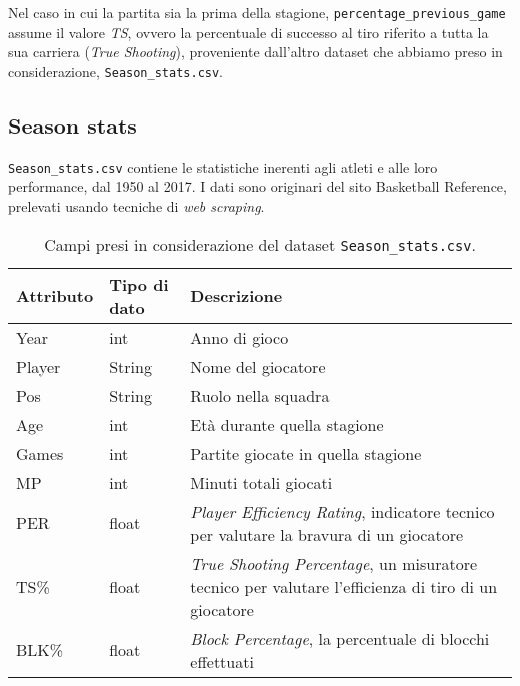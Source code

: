 \begin{code}
\inputminted[breaklines]{python}{../datasets/shot_logs_nv.py}
\end{code}

Nel caso in cui la partita sia la prima della stagione, \texttt{percentage\_previous\_game} assume il valore \textit{TS}, ovvero la percentuale di successo al tiro riferito a tutta la sua carriera (\textit{True Shooting}), proveniente dall’altro dataset che abbiamo preso in considerazione, \texttt{Season\_stats.csv}.

\subsection{Season stats}

\texttt{Season\_stats.csv} contiene le statistiche inerenti agli atleti e alle loro performance, dal 1950 al 2017. I dati sono originari del sito Basketball Reference, prelevati usando tecniche di \textit{web scraping}.

\begin{center}
	\begin{longtable}[m]{|m{5em} m{7em} m{16em}|} 

		\caption{Campi presi in considerazione del dataset \texttt{Season\_stats.csv}.\label{long}}\\
		\hline
		\bfseries{Attributo} & \bfseries{Tipo di dato} & \bfseries{Descrizione} \\
		\hline

		Year & int & Anno di gioco\\ 
		\hline
		Player & String & Nome del giocatore\\ 
		\hline
		Pos & String & Ruolo nella squadra\\ 
		\hline
		Age & int & Età durante quella stagione\\ 
		\hline
		Games & int & Partite giocate in quella stagione\\ 
		\hline
		MP & int & Minuti totali giocati\\ 
		\hline
		PER & float & \textit{Player Efficiency Rating}, indicatore tecnico per valutare la bravura di un giocatore \\ 
		\hline
		TS\% & float & \textit{True Shooting Percentage}, un misuratore tecnico per valutare l’efficienza di tiro di un giocatore  \\ 
		\hline
		BLK\% & float & \textit{Block Percentage}, la percentuale di blocchi effettuati \\ 
		\hline

	\end{longtable}
\end{center}


